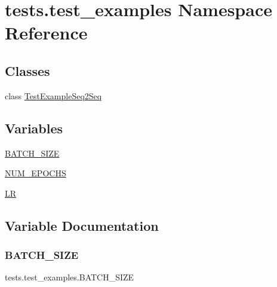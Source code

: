\hypertarget{namespacetests_1_1test__examples}{}\section{tests.\+test\+\_\+examples Namespace Reference}
\label{namespacetests_1_1test__examples}
\subsection*{Classes}
\begin{DoxyCompactItemize}
\item 
class \hyperlink{classtests_1_1test__examples_1_1TestExampleSeq2Seq}{Test\+Example\+Seq2\+Seq}
\end{DoxyCompactItemize}
\subsection*{Variables}
\begin{DoxyCompactItemize}
\item 
\hyperlink{namespacetests_1_1test__examples_a9f40d6c6f7fed59c0c83509f15a97f96}{B\+A\+T\+C\+H\+\_\+\+S\+I\+ZE}
\item 
\hyperlink{namespacetests_1_1test__examples_a7b5adbffd811f8c5f832dde5985f110f}{N\+U\+M\+\_\+\+E\+P\+O\+C\+HS}
\item 
\hyperlink{namespacetests_1_1test__examples_ab842215a61743bb9c3b609eff4c0f8ef}{LR}
\end{DoxyCompactItemize}


\subsection{Variable Documentation}
\mbox{\label{namespacetests_1_1test__examples_a9f40d6c6f7fed59c0c83509f15a97f96}} 
\subsubsection{\texorpdfstring{B\+A\+T\+C\+H\+\_\+\+S\+I\+ZE}{BATCH\_SIZE}}
{\footnotesize\ttfamily tests.\+test\+\_\+examples.\+B\+A\+T\+C\+H\+\_\+\+S\+I\+ZE}



